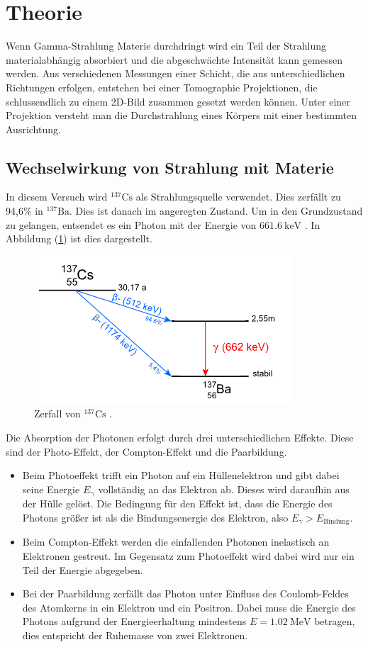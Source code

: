 
\section{Theorie}
\label{sec:Theorie}
Wenn Gamma-Strahlung Materie durchdringt wird ein Teil der Strahlung materialabhängig absorbiert und die abgeschwächte Intensität kann gemessen werden. Aus verschiedenen Messungen einer Schicht, die aus unterschiedlichen Richtungen erfolgen, entstehen bei einer Tomographie Projektionen, die schlussendlich zu einem 2D-Bild zusammen gesetzt werden können. Unter einer Projektion versteht man die Durchstrahlung eines Körpers mit einer bestimmten Ausrichtung. \\
\subsection{Wechselwirkung von Strahlung mit Materie}
In diesem Versuch wird ${}^{137}\mathrm{Cs}$ als Strahlungsquelle verwendet. Dies zerfällt zu 94,6\% in ${}^{137}\mathrm{Ba}$. Dies ist danach im angeregten Zustand. Um in den Grundzustand zu gelangen, entsendet es ein Photon mit der Energie von $\SI{661,6}{\kilo\electronvolt}$ \cite{Anleitung5}. In Abbildung (\ref{fig:caes}) ist dies dargestellt.
\begin{figure}
	\centering
	\includegraphics[scale=0.7]{fig/caes.png}
	\caption{Zerfall von ${}^{137}\mathrm{Cs}$ \cite{leifi}.}
	\label{fig:caes}
\end{figure}
\FloatBarrier
\noindent Die Absorption der Photonen erfolgt durch drei unterschiedlichen Effekte. Diese sind der Photo-Effekt, der Compton-Effekt und die Paarbildung.
\begin{itemize}
	\item Beim Photoeffekt trifft ein Photon auf ein Hüllenelektron und gibt dabei seine Energie $E_\mathrm{\gamma}$ vollständig an das Elektron ab. Dieses wird daraufhin
	aus der Hülle gelöst. Die Bedingung für den Effekt ist, dass die Energie des Photons größer ist als die Bindungsenergie des Elektron, also $E_\gamma>E_\mathrm{Bindung}$.
	\item Beim Compton-Effekt werden die einfallenden Photonen inelastisch an Elektronen gestreut. Im Gegensatz zum Photoeffekt wird dabei wird nur ein Teil der Energie abgegeben.
 	\item Bei der Paarbildung zerfällt das Photon unter Einfluss des Coulomb-Feldes des Atomkerns in ein Elektron und ein Positron. Dabei muss die Energie des Photons aufgrund der Energieerhaltung mindestens $E=\SI{1,02}{\mega\electronvolt}$ betragen, dies entspricht der Ruhemasse von zwei Elektronen.
\end{itemize}
